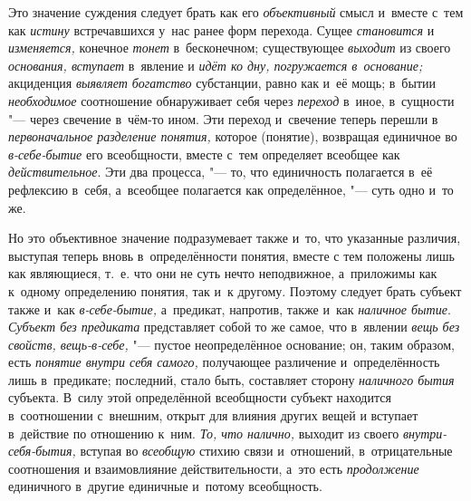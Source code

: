 \label{bkm:bm31a}Это значение суждения следует брать как его {\em объективный}
смысл и~вместе с~тем как {\em истину} встречавшихся у~нас ранее форм перехода.
Сущее {\em становится} и {\em изменяется,} конечное {\em тонет} в~бесконечном;
существующее {\em выходит} из своего {\em основания, вступает} в~явление
и {\em идёт ко дну, погружается в~основание;} акциденция {\em выявляет
богатство} субстанции, равно как и~её мощь; в~бытии {\em необходимое}
соотношение обнаруживает себя через {\em переход} в~иное, в~сущности "--- через
свечение в~чём-то ином. Эти переход и~свечение теперь перешли
в {\em первоначальное разделение понятия,} которое (понятие), возвращая
единичное во {\em в-себе-бытие} его всеобщности, вместе с~тем определяет
всеобщее как {\em действительное}. Эти два процесса, "--- то, что единичность
полагается в~её рефлексию в~себя, а~всеобщее полагается как
определённое, "--- суть одно и~то же.

Но это объективное значение подразумевает также и~то, что
указанные различия, выступая теперь вновь в~определённости понятия, вместе
с тем положены лишь как являющиеся, т.~е. что они не суть нечто
неподвижное, а~приложимы как к~одному определению понятия, так и~к другому.
Поэтому следует брать субъект также и~как {\em в-себе-бытие,}
а~предикат, напротив, также и~как {\em наличное бытие}.
{\em Субъект без предиката} представляет собой то же самое, что в~явлении
{\em вещь без свойств, вещь-в-себе,} "--- пустое неопределённое
основание; он, таким образом, есть {\em понятие внутри себя самого,}
получающее различение и~определённость лишь в~предикате;
последний, стало быть, составляет сторону {\em наличного бытия}
субъекта. В~силу этой определённой всеобщности субъект
находится в~соотношении с~внешним, открыт для влияния других вещей и
вступает в~действие по отношению к~ним. {\em То, что налично,} выходит
из своего {\em внутри-себя-бытия,} вступая во {\em всеобщую}
стихию связи и~отношений, в~отрицательные соотношения и
взаимовлияние действительности, а~это есть {\em продолжение}
единичного в~другие единичные и~потому всеобщность.

